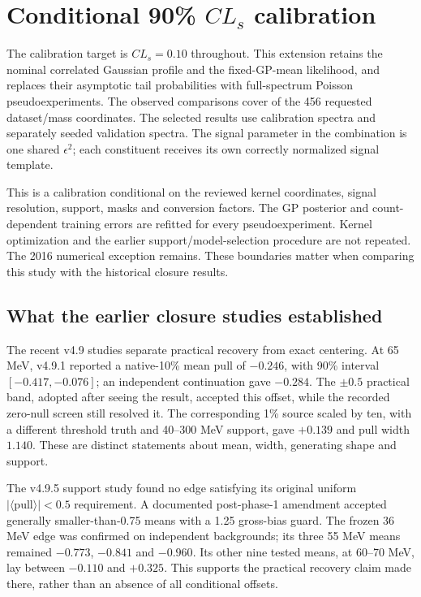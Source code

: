 \clearpage
\section{Conditional 90\% $CL_s$ calibration}\label{sec:calibration}


The calibration target is $CL_s=0.10$ throughout. This extension retains the
nominal correlated Gaussian profile and the fixed-GP-mean likelihood, and
replaces their asymptotic tail probabilities with full-spectrum Poisson
pseudoexperiments. The observed comparisons cover \CalComplete{} of the 456
requested dataset/mass coordinates. The selected results use \CalSpectra{} calibration
spectra and \ValidationSpectra{} separately seeded validation spectra.
The signal parameter in the combination is one shared $\epsilon^2$; each
constituent receives its own correctly normalized signal template.

This is a calibration conditional on the reviewed kernel coordinates, signal
resolution, support, masks and conversion factors. The GP posterior and
count-dependent training errors are refitted for every pseudoexperiment.
Kernel optimization and the earlier support/model-selection procedure are
not repeated. The 2016 numerical exception remains. These boundaries matter
when comparing this study with the historical closure results.

\subsection{What the earlier closure studies established}

The recent v4.9 studies separate practical recovery from exact centering.
At 65 MeV, v4.9.1 reported a native-10\% mean pull of $-0.246$, with 90\%
interval $[-0.417,-0.076]$; an independent continuation gave $-0.284$.
The $\pm0.5$ practical band, adopted after seeing the result, accepted this offset, while the recorded
zero-null screen still resolved it. The corresponding 1\% source scaled
by ten, with a different threshold truth and 40--300 MeV support, gave
$+0.139$ and pull width $1.140$. These are distinct statements about mean,
width, generating shape and support.

The v4.9.5 support study found no edge satisfying its original uniform
$|\langle\mathrm{pull}\rangle|<0.5$ requirement. A documented post-phase-1
amendment accepted generally smaller-than-0.75 means with a 1.25 gross-bias
guard. The frozen 36 MeV edge was confirmed on independent backgrounds;
its three 55 MeV means remained $-0.773$, $-0.841$ and $-0.960$. Its other
nine tested means, at 60--70 MeV, lay between $-0.110$ and $+0.325$.
This supports the practical recovery claim made there, rather than an
absence of all conditional offsets.

